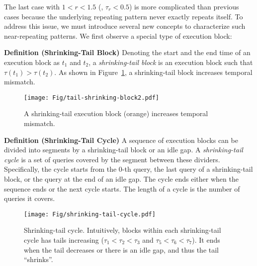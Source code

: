 
The last case with $1 < r < 1.5$ (\ie, $\tau_r < 0.5$) is more complicated than previous cases because the underlying repeating pattern never exactly repeats itself. To address this issue, we must introduce several new concepts to characterize such near-repeating patterns. We first observe a special type of execution block:

{\noindent \bf  Definition (Shrinking-Tail Block)} Denoting the start and the end time of an execution block as $t_1$ and $t_2$, a {\em shrinking-tail block} is an execution block such that $\tau(t_1) > \tau(t_2)$. As shown in Figure~\ref{fig:shrinking-tail-block}, a shrinking-tail block increases temporal mismatch.

\begin{figure}[]
\centering
\texttt{[image: Fig/tail-shrinking-block2.pdf]}

\caption{A shrinking-tail execution block (orange) increases temporal mismatch.
}
\label{fig:shrinking-tail-block}
\end{figure}


{\noindent \bf  Definition (Shrinking-Tail Cycle)} A sequence of execution blocks can be divided into segments by a shrinking-tail block or an idle gap. A {\em shrinking-tail cycle} is a set of queries covered by the segment between these dividers. Specifically, the cycle starts from the 0-th query, the last query of a shrinking-tail block, or the query at the end of an idle gap. The cycle ends either when the sequence ends or the next cycle starts. The length of a cycle is the number of queries it covers. 


\begin{figure}[]
\centering
\texttt{[image: Fig/shrinking-tail-cycle.pdf]}

\caption{Shrinking-tail cycle. Intuitively, blocks within each shrinking-tail cycle has tails increasing ($\tau_1 < \tau_2 < \tau_3$ and $\tau_5 < \tau_6 < \tau_7$). It ends when the tail decreases or there is an idle gap, and thus the tail ``shrinks''.
}
\label{fig:shrinking-tail-cycle}
\end{figure}



